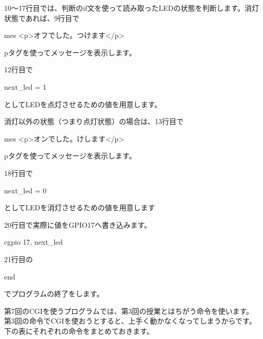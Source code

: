 \documentclass[a4paper,12pt,dvipdfmx]{jarticle}
\begin{document}
\bigskip


10〜17行目では、判断のif文を使って読み取ったLEDの状態を判断します。消灯状態であれば、9行目で

mes
	{\textquotedbl}{\textless}p{\textgreater}オフでした。つけます{\textless}/p{\textgreater}{\textquotedbl}

pタグを使ってメッセージを表示します。

\bigskip

12行目で

next\_led = 1

としてLEDを点灯させるための値を用意します。

\bigskip

消灯以外の状態（つまり点灯状態）の場合は、13行目で

mes
	{\textquotedbl}{\textless}p{\textgreater}オンでした。けします{\textless}/p{\textgreater}{\textquotedbl}

pタグを使ってメッセージを表示します。

\bigskip

18行目で

next\_led = 0

としてLEDを消灯させるための値を用意します

\bigskip

20行目で実際に値をGPIO17へ書き込みます。

cgpio 17, next\_led




\bigskip

21行目の

end

でプログラムの終了をします。


\bigskip



第7回のCGIを使うプログラムでは、第3回の授業とはちがう命令を使います。\\
第3回の命令でCGIを使おうとすると、上手く動かなくなってしまうからです。\\
下の表にそれぞれの命令をまとめておきます。\\
\end{document}
